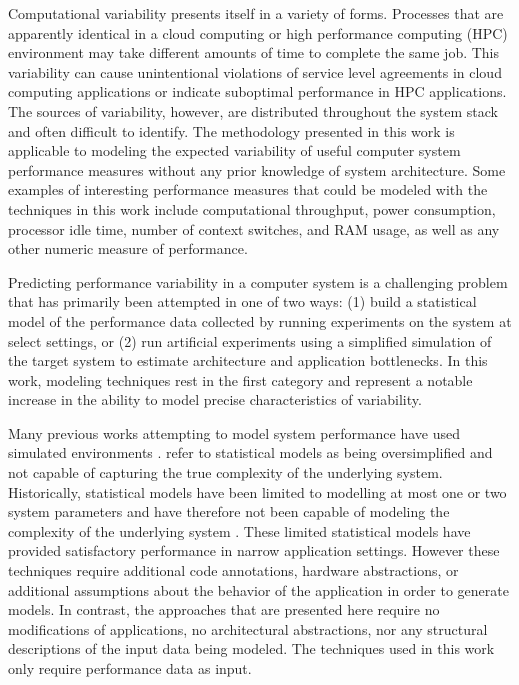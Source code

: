 
Computational variability presents itself in a variety of forms. Processes that are apparently identical in a cloud computing or high performance computing (HPC) environment may take different amounts of time to complete the same job. This variability can cause unintentional violations of service level agreements in cloud computing applications or indicate suboptimal performance in HPC applications. The sources of variability, however, are distributed throughout the system stack and often difficult to identify. The methodology presented in this work is applicable to modeling the expected variability of useful computer system performance measures without any prior knowledge of system architecture. Some examples of interesting performance measures that could be modeled with the techniques in this work include computational throughput, power consumption, processor idle time, number of context switches, and RAM usage, as well as any other numeric measure of performance.

Predicting performance variability in a computer system is a challenging problem that has primarily been attempted in one of two ways: (1) build a statistical model of the performance data collected by running experiments on the system at select settings, or (2) run artificial experiments using a simplified simulation of the target system to estimate architecture and application bottlenecks. In this work, modeling techniques rest in the first category and represent a notable increase in the ability to model precise characteristics of variability.

Many previous works attempting to model system performance have used simulated environments \cite{grobelny2007fase,wang2009simulation,wang2013towards}. \citet{grobelny2007fase} refer to statistical models as being oversimplified and not capable of capturing the true complexity of the underlying system. Historically, statistical models have been limited to modelling at most one or two system parameters and have therefore not been capable of modeling the complexity of the underlying system \cite{snavely2002framework,bailey2005performance,barker2009using,ye2010analyzing}. These limited statistical models have provided satisfactory performance in narrow application settings. However these techniques require additional code annotations, hardware abstractions, or additional assumptions about the behavior of the application in order to generate models. In contrast, the approaches that are presented here require no modifications of applications, no architectural abstractions, nor any structural descriptions of the input data being modeled. The techniques used in this work only require performance data as input.

